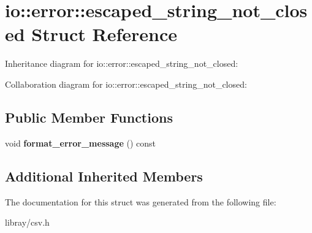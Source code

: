 \hypertarget{structio_1_1error_1_1escaped__string__not__closed}{}\section{io\+:\+:error\+:\+:escaped\+\_\+string\+\_\+not\+\_\+closed Struct Reference}
\label{structio_1_1error_1_1escaped__string__not__closed}


Inheritance diagram for io\+:\+:error\+:\+:escaped\+\_\+string\+\_\+not\+\_\+closed\+:


Collaboration diagram for io\+:\+:error\+:\+:escaped\+\_\+string\+\_\+not\+\_\+closed\+:
\subsection*{Public Member Functions}
\begin{DoxyCompactItemize}
\item 
\mbox{\label{structio_1_1error_1_1escaped__string__not__closed_a696911cd3cfaf8a30a728101b076028d}} 
void {\bfseries format\+\_\+error\+\_\+message} () const
\end{DoxyCompactItemize}
\subsection*{Additional Inherited Members}


The documentation for this struct was generated from the following file\+:\begin{DoxyCompactItemize}
\item 
libray/csv.\+h\end{DoxyCompactItemize}
